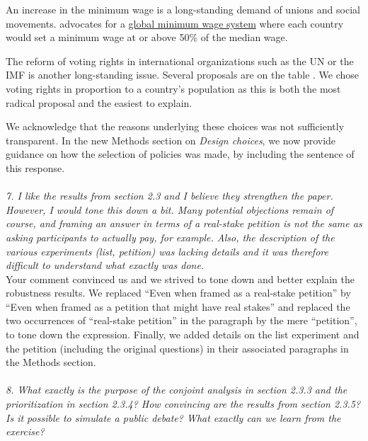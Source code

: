 \documentclass[12pt,english]{article}
\begin{document}
An increase in the minimum wage is a long-standing demand of unions and social movements. \citet{palley_financial_2013} advocates for a \href{https://www.ft.com/content/fa0af8ca-345a-318b-8850-d8d93e61feaa}{global minimum wage system} where each country would set a minimum wage at or above 50\% of the median wage. 

The reform of voting rights in international organizations such as the UN or the IMF is another long-standing issue. Several proposals are on the table \citep{woodward_imf_2007}. We chose voting rights in proportion to a country's population as this is both the most radical proposal and the easiest to explain. 


We acknowledge that the reasons underlying these choices was not sufficiently transparent. In the new Methods section on \textit{Design choices}, we now provide guidance on how the selection of policies was made, by including the sentence of this response. 
~\\ ~\\

\textit{7. I like the results from section 2.3 and I believe they strengthen the paper. However, I would tone this down a bit. Many potential objections remain of course, and framing an answer in terms of a real-stake petition is not the same as asking participants to actually pay, for example. Also, the description of the various experiments (list, petition) was lacking details and it was therefore difficult to understand what exactly was done.}~\\

Your comment convinced us and we strived to tone down and better explain the robustness results. We replaced ``Even when framed as a real-stake petition'' by ``Even when framed as a petition that might have real stakes'' and replaced the two occurrences of ``real-stake petition'' in the paragraph by the mere ``petition'', to tone down the expression. Finally, we added details on the list experiment and the petition (including the original questions) in their associated paragraphs in the Methods section.
~\\ ~\\

\textit{8. What exactly is the purpose of the conjoint analysis in section 2.3.3 and the prioritization in section 2.3.4? How convincing are the results from section 2.3.5? %
Is it possible to simulate a public debate? What exactly can we learn from the exercise?}~\\
\end{document}
